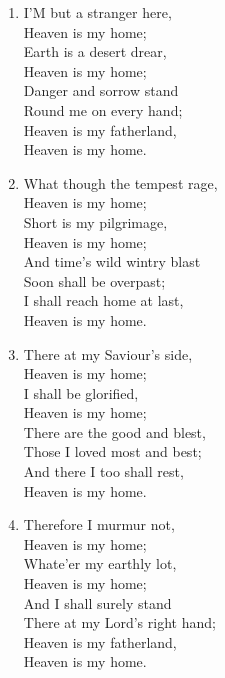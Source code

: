 \documentclass[11pt,a4paper]{article}
\begin{document}
\begin{enumerate}
    \item I'M but a stranger here, \\
        Heaven is my home; \\
        Earth is a desert drear, \\
        Heaven is my home; \\
        Danger and sorrow stand \\
        Round me on every hand; \\
        Heaven is my fatherland, \\
        Heaven is my home.

    \item What though the tempest rage, \\
        Heaven is my home; \\
        Short is my pilgrimage, \\
        Heaven is my home; \\
        And time's wild wintry blast \\
        Soon shall be overpast; \\
        I shall reach home at last, \\
        Heaven is my home.

    \item There at my Saviour's side, \\
        Heaven is my home; \\
        I shall be glorified, \\
        Heaven is my home; \\
        There are the good and blest, \\
        Those I loved most and best; \\
        And there I too shall rest, \\
        Heaven is my home.

    \item Therefore I murmur not, \\
        Heaven is my home; \\
        Whate'er my earthly lot, \\
        Heaven is my home; \\
        And I shall surely stand \\
        There at my Lord's right hand; \\
        Heaven is my fatherland, \\
        Heaven is my home.

\end{enumerate}
\end{document}
